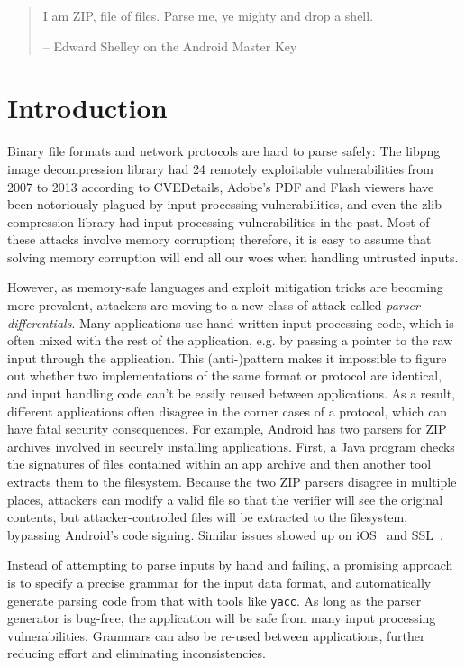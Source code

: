 \begin{quote}
  I am ZIP, file of files.
  Parse me, ye mighty and drop a shell.

  -- Edward Shelley on the Android Master Key
\end{quote}
\section{Introduction}
Binary file formats and network protocols are hard to parse safely: 
The libpng image decompression library had 24 remotely
exploitable vulnerabilities from 2007 to 2013 according to CVEDetails,
Adobe's PDF and Flash viewers have been notoriously plagued by input
processing vulnerabilities, and even the zlib compression library had
input processing vulnerabilities in the past.
Most of these attacks involve memory corruption; therefore, it is easy to assume that 
solving memory corruption will end all our woes when handling untrusted inputs. 

However, as memory-safe languages and exploit mitigation  tricks are becoming more prevalent,
attackers are moving to a new class of attack called {\em parser differentials}. Many applications use
hand-written input processing code, which is often mixed with the rest of the application, e.g. by
passing a pointer to the raw input through the application. This (anti-)pattern makes it impossible
to figure out whether two implementations of the same format or protocol are identical, and input
handling code can't be easily reused between applications. As a result, different applications often
disagree in the corner cases of a protocol, which can have fatal security consequences. For example,
Android has two parsers for ZIP archives involved in securely installing applications. First, a Java
program checks the signatures of files contained within an app archive and then another tool
extracts them to the filesystem. Because the two ZIP parsers disagree in multiple places, attackers
can modify a valid file so that the verifier will see the original contents, but attacker-controlled
files will be extracted to the filesystem, bypassing Android's code signing. Similar issues showed
up on iOS~\cite{geohot-evasion} and SSL~\cite{DBLP:conf/fc/KaminskyPS10}. 

Instead of attempting to parse inputs by hand and failing, 
a promising approach is to specify
a precise grammar for the input data format, and automatically generate parsing code from that with tools like {\tt yacc}. As long
as the parser generator is bug-free, the application will be safe from many
input processing vulnerabilities. Grammars can also be re-used between
applications, further reducing effort and eliminating inconsistencies.

